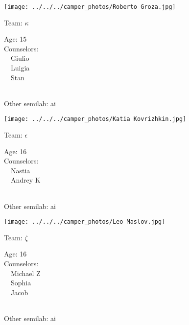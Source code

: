 \documentclass[10pt,letterpaper, landscape]{article}
\begin{document}
\horizontalshiftfornextsticker
\renewcommand{\baselinestretch}{1} \begin{sticker}
\noindent\begin{minipage}{0.5\textwidth}\texttt{[image: ../../../camper\_photos/Roberto Groza.jpg]}\end{minipage}\begin{minipage}{0.45\textwidth}
Team: {\Large $\kappa$}

Age:        15\\
Counselors: \\\ \ Giulio\\\ \ Luigia\\\ \ Stan\\
\end{minipage} \\ \vspace{0.07in}
Other semilab: ai
\end{sticker}
\horizontalshiftfornextsticker
\renewcommand{\baselinestretch}{1} \begin{sticker}
\noindent\begin{minipage}{0.5\textwidth}\texttt{[image: ../../../camper\_photos/Katia Kovrizhkin.jpg]}\end{minipage}\begin{minipage}{0.45\textwidth}
Team: {\Large $\epsilon$}

Age:        16\\
Counselors: \\\ \ Nastia\\\ \ Andrey K\\
\end{minipage} \\ \vspace{0.07in}
Other semilab: ai
\end{sticker}
\verticalshiftfornextsticker
\renewcommand{\baselinestretch}{1} \begin{sticker}
\noindent\begin{minipage}{0.5\textwidth}\texttt{[image: ../../../camper\_photos/Leo Maslov.jpg]}\end{minipage}\begin{minipage}{0.45\textwidth}
Team: {\Large $\zeta$}

Age:        16\\
Counselors: \\\ \ Michael Z\\\ \ Sophia\\\ \ Jacob\\
\end{minipage} \\ \vspace{0.07in}
Other semilab: ai
\end{sticker}
\end{document}
